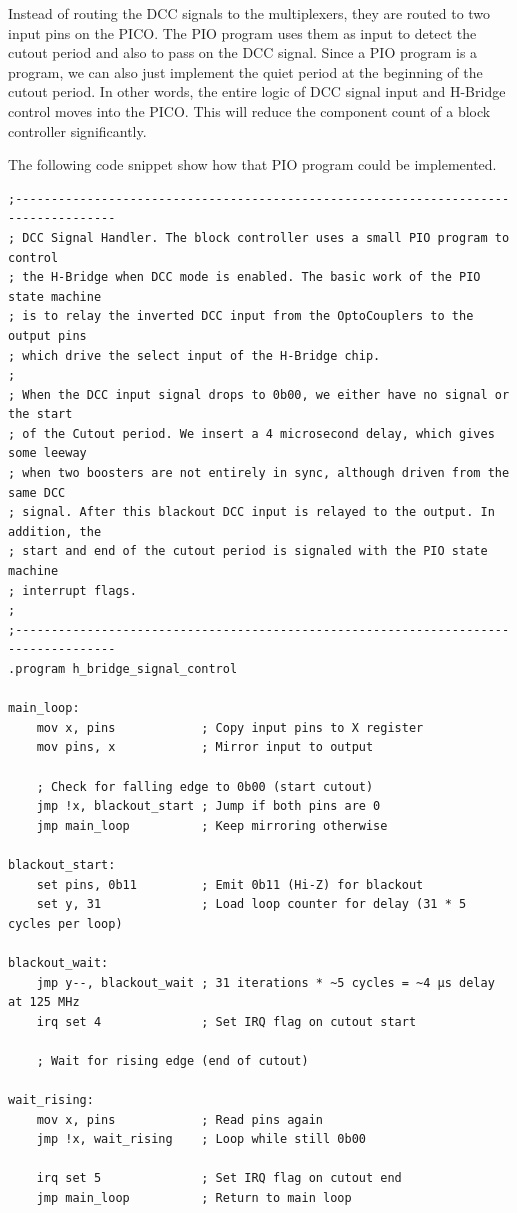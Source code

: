 Instead of routing the DCC signals to the multiplexers, they are routed to two input pins on the PICO. The PIO program uses them as input to detect the cutout period and also to pass on the DCC signal. Since a PIO program is a program, we can also just implement the quiet period at the beginning of the cutout period. In other words, the entire logic of DCC signal input and H-Bridge control moves into the PICO. This will reduce the component count of a block controller significantly.

The following code snippet show how that PIO program could be implemented.

\pagebreak[3] %
\lstset{style=codesnippetstyle}
\begin{lstlisting}
;------------------------------------------------------------------------------------
; DCC Signal Handler. The block controller uses a small PIO program to control
; the H-Bridge when DCC mode is enabled. The basic work of the PIO state machine
; is to relay the inverted DCC input from the OptoCouplers to the output pins
; which drive the select input of the H-Bridge chip. 
; 
; When the DCC input signal drops to 0b00, we either have no signal or the start
; of the Cutout period. We insert a 4 microsecond delay, which gives some leeway
; when two boosters are not entirely in sync, although driven from the same DCC 
; signal. After this blackout DCC input is relayed to the output. In addition, the
; start and end of the cutout period is signaled with the PIO state machine 
; interrupt flags.
;
;------------------------------------------------------------------------------------
.program h_bridge_signal_control

main_loop:
    mov x, pins            ; Copy input pins to X register
    mov pins, x            ; Mirror input to output

    ; Check for falling edge to 0b00 (start cutout)
    jmp !x, blackout_start ; Jump if both pins are 0
    jmp main_loop          ; Keep mirroring otherwise

blackout_start:
    set pins, 0b11         ; Emit 0b11 (Hi-Z) for blackout
    set y, 31              ; Load loop counter for delay (31 * 5 cycles per loop)

blackout_wait:
    jmp y--, blackout_wait ; 31 iterations * ~5 cycles = ~4 µs delay at 125 MHz
    irq set 4              ; Set IRQ flag on cutout start

    ; Wait for rising edge (end of cutout)

wait_rising:
    mov x, pins            ; Read pins again
    jmp !x, wait_rising    ; Loop while still 0b00

    irq set 5              ; Set IRQ flag on cutout end
    jmp main_loop          ; Return to main loop
    
\end{lstlisting}

